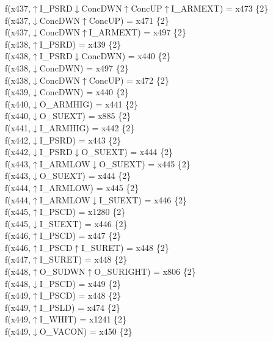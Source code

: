 f(x437,$\uparrow$I\_PSRD$\downarrow$ConcDWN$\uparrow$ConcUP$\uparrow$I\_ARMEXT) = x473 \{2\} \\  
f(x437,$\downarrow$ConcDWN$\uparrow$ConcUP) = x471 \{2\} \\  
f(x437,$\downarrow$ConcDWN$\uparrow$I\_ARMEXT) = x497 \{2\} \\  
f(x438,$\uparrow$I\_PSRD) = x439 \{2\} \\  
f(x438,$\uparrow$I\_PSRD$\downarrow$ConcDWN) = x440 \{2\} \\  
f(x438,$\downarrow$ConcDWN) = x497 \{2\} \\  
f(x438,$\downarrow$ConcDWN$\uparrow$ConcUP) = x472 \{2\} \\  
f(x439,$\downarrow$ConcDWN) = x440 \{2\} \\  
f(x440,$\downarrow$O\_ARMHIG) = x441 \{2\} \\  
f(x440,$\downarrow$O\_SUEXT) = x885 \{2\} \\  
f(x441,$\downarrow$I\_ARMHIG) = x442 \{2\} \\  
f(x442,$\downarrow$I\_PSRD) = x443 \{2\} \\  
f(x442,$\downarrow$I\_PSRD$\downarrow$O\_SUEXT) = x444 \{2\} \\  
f(x443,$\uparrow$I\_ARMLOW$\downarrow$O\_SUEXT) = x445 \{2\} \\  
f(x443,$\downarrow$O\_SUEXT) = x444 \{2\} \\  
f(x444,$\uparrow$I\_ARMLOW) = x445 \{2\} \\  
f(x444,$\uparrow$I\_ARMLOW$\downarrow$I\_SUEXT) = x446 \{2\} \\  
f(x445,$\uparrow$I\_PSCD) = x1280 \{2\} \\  
f(x445,$\downarrow$I\_SUEXT) = x446 \{2\} \\  
f(x446,$\uparrow$I\_PSCD) = x447 \{2\} \\  
f(x446,$\uparrow$I\_PSCD$\uparrow$I\_SURET) = x448 \{2\} \\  
f(x447,$\uparrow$I\_SURET) = x448 \{2\} \\  
f(x448,$\uparrow$O\_SUDWN$\uparrow$O\_SURIGHT) = x806 \{2\} \\  
f(x448,$\downarrow$I\_PSCD) = x449 \{2\} \\  
f(x449,$\uparrow$I\_PSCD) = x448 \{2\} \\  
f(x449,$\uparrow$I\_PSLD) = x474 \{2\} \\  
f(x449,$\uparrow$I\_WHIT) = x1241 \{2\} \\  
f(x449,$\downarrow$O\_VACON) = x450 \{2\} \\  
